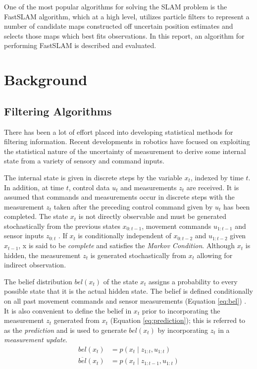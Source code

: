 \documentclass[english]{article}
\begin{document}
One of the most popular algorithms for solving the SLAM problem is the FastSLAM algorithm, which at a high level, utilizes particle filters to represent a number of candidate maps constructed off uncertain position estimates and selects those maps which best fits observations. In this report, an algorithm for performing FastSLAM is described and evaluated.

\section{Background}

\subsection{Filtering Algorithms}
There has been a lot of effort placed into developing statistical methods for filtering information. Recent developments in robotics have focused on exploiting the statistical nature of the uncertainty of measurement to derive some internal state from a variety of sensory and command inputs.

The internal state is given in discrete steps by the variable $x_t$, indexed by time $t$. In addition, at time $t$, control data $u_t$ and measurements $z_t$ are received. It is assumed that commands and measurements occur in discrete steps with the measurement $z_t$ taken after the preceding control command given by $u_t$ has been completed. The state $x_t$ is not directly observable and must be generated stochastically from the previous states $x_{0:t-1}$, movement commands $u_{1:t-1}$ and sensor inputs $z_{0:t}$ \cite{Thrun02d}. If $x_t$ is conditionally independent of $x_{0:t-2}$ and $u_{1:t-2}$ given $x_{t-1}$, x is said to be \emph{complete} and satisfies the \emph{Markov Condition}\cite{probrob}. Although $x_t$ is hidden, the measurement $z_t$ is generated stochastically from $x_t$ allowing for indirect observation\cite{Thrun02d}.

The belief distribution $bel(x_t)$ of the state $x_t$ assigns a probability to every possible state that it is the actual hidden state. The belief is defined conditionally on all past movement commands and sensor measurements (Equation \ref{eq:bel}) \cite{probrob}. It is also convenient to define the belief in $x_t$ prior to incorporating the measurement $z_t$ generated from $x_t$ (Equation \ref{eq:prediction}); this is referred to as the \emph{prediction} and is used to generate $bel(x_t)$ by incorporating $z_t$ in a \emph{measurement update}.
\begin {align}
  bel(x_t) & = p(x_t \mid z_{1:t},u_{1:t}) \label{eq:bel} \\   
  \overline{bel}(x_t) & = p(x_t \mid z_{1:t-1}, u_{1:t}) \label{eq:prediction}
\end {align}
\end{document}
